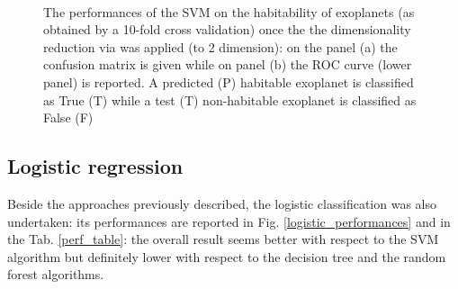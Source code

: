 \documentclass[
12pt, %
a4paper, %
oneside, %
headinclude,footinclude, %
BCOR5mm, %
]{scrartcl}
\begin{document}
\begin{figure}[h]
  \centering
{}\\
\caption{The performances of the SVM on the habitability of exoplanets (as obtained by a 10-fold cross validation) once the the dimensionality reduction via was applied (to 2 dimension): on the panel (a) the confusion matrix is given  while on panel (b) the ROC curve (lower panel) is reported. A predicted (P) habitable exoplanet is classified as True (T) while a test (T) non-habitable exoplanet is classified as False (F)}
\label{SVM+PCA_results}
\end{figure}

\clearpage


\subsection{Logistic regression}
Beside the approaches previously described, the logistic classification was also undertaken: its performances are reported in Fig. \ref{logistic_performances} and in the Tab. \ref{perf_table}: the overall result seems better with respect to the SVM algorithm but definitely lower with respect to the decision tree and the random forest algorithms. 
\end{document}
